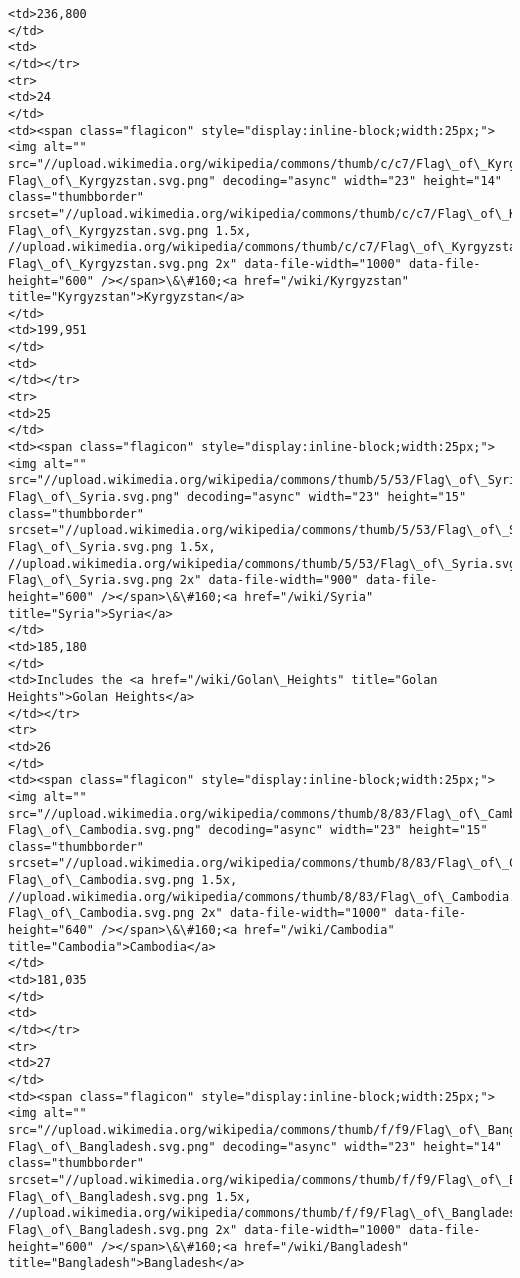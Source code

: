 \documentclass[11pt]{article}
\begin{document}
\begin{Verbatim}[commandchars=\\\{\}]
<td>236,800
</td>
<td>
</td></tr>
<tr>
<td>24
</td>
<td><span class="flagicon" style="display:inline-block;width:25px;"><img alt="" src="//upload.wikimedia.org/wikipedia/commons/thumb/c/c7/Flag\_of\_Kyrgyzstan.svg/23px-Flag\_of\_Kyrgyzstan.svg.png" decoding="async" width="23" height="14" class="thumbborder" srcset="//upload.wikimedia.org/wikipedia/commons/thumb/c/c7/Flag\_of\_Kyrgyzstan.svg/35px-Flag\_of\_Kyrgyzstan.svg.png 1.5x, //upload.wikimedia.org/wikipedia/commons/thumb/c/c7/Flag\_of\_Kyrgyzstan.svg/46px-Flag\_of\_Kyrgyzstan.svg.png 2x" data-file-width="1000" data-file-height="600" /></span>\&\#160;<a href="/wiki/Kyrgyzstan" title="Kyrgyzstan">Kyrgyzstan</a>
</td>
<td>199,951
</td>
<td>
</td></tr>
<tr>
<td>25
</td>
<td><span class="flagicon" style="display:inline-block;width:25px;"><img alt="" src="//upload.wikimedia.org/wikipedia/commons/thumb/5/53/Flag\_of\_Syria.svg/23px-Flag\_of\_Syria.svg.png" decoding="async" width="23" height="15" class="thumbborder" srcset="//upload.wikimedia.org/wikipedia/commons/thumb/5/53/Flag\_of\_Syria.svg/35px-Flag\_of\_Syria.svg.png 1.5x, //upload.wikimedia.org/wikipedia/commons/thumb/5/53/Flag\_of\_Syria.svg/45px-Flag\_of\_Syria.svg.png 2x" data-file-width="900" data-file-height="600" /></span>\&\#160;<a href="/wiki/Syria" title="Syria">Syria</a>
</td>
<td>185,180
</td>
<td>Includes the <a href="/wiki/Golan\_Heights" title="Golan Heights">Golan Heights</a>
</td></tr>
<tr>
<td>26
</td>
<td><span class="flagicon" style="display:inline-block;width:25px;"><img alt="" src="//upload.wikimedia.org/wikipedia/commons/thumb/8/83/Flag\_of\_Cambodia.svg/23px-Flag\_of\_Cambodia.svg.png" decoding="async" width="23" height="15" class="thumbborder" srcset="//upload.wikimedia.org/wikipedia/commons/thumb/8/83/Flag\_of\_Cambodia.svg/35px-Flag\_of\_Cambodia.svg.png 1.5x, //upload.wikimedia.org/wikipedia/commons/thumb/8/83/Flag\_of\_Cambodia.svg/46px-Flag\_of\_Cambodia.svg.png 2x" data-file-width="1000" data-file-height="640" /></span>\&\#160;<a href="/wiki/Cambodia" title="Cambodia">Cambodia</a>
</td>
<td>181,035
</td>
<td>
</td></tr>
<tr>
<td>27
</td>
<td><span class="flagicon" style="display:inline-block;width:25px;"><img alt="" src="//upload.wikimedia.org/wikipedia/commons/thumb/f/f9/Flag\_of\_Bangladesh.svg/23px-Flag\_of\_Bangladesh.svg.png" decoding="async" width="23" height="14" class="thumbborder" srcset="//upload.wikimedia.org/wikipedia/commons/thumb/f/f9/Flag\_of\_Bangladesh.svg/35px-Flag\_of\_Bangladesh.svg.png 1.5x, //upload.wikimedia.org/wikipedia/commons/thumb/f/f9/Flag\_of\_Bangladesh.svg/46px-Flag\_of\_Bangladesh.svg.png 2x" data-file-width="1000" data-file-height="600" /></span>\&\#160;<a href="/wiki/Bangladesh" title="Bangladesh">Bangladesh</a>

\end{Verbatim}
\end{document}
